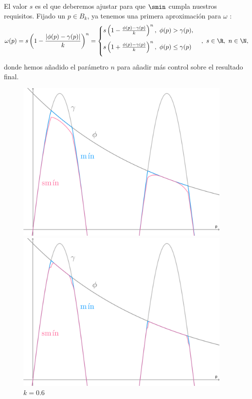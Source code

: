 El valor $s$ es el que deberemos ajustar para que $\smin$ cumpla nuestros requisitos. Fijado un $p\in B_{k}$, ya tenemos una primera aproximación para $\omega$ :
\begin{equation*}
    \omega(p) = s\left( 1-\frac{|\phi(p)-\gamma(p)|}{k} \right)^n = \begin{cases}
        s\left( 1-\frac{\phi(p)-\gamma(p)}{k}\right)^n,\ \phi(p)>\gamma(p), \\[10pt]
        s\left( 1+\frac{\phi(p)-\gamma(p)}{k}\right)^n,\ \phi(p)\le \gamma(p)\\[10pt]
    \end{cases}  ,\ s\in\R,\ n\in\N,
\end{equation*}
donde hemos añadido el parámetro $n$ para añadir más control sobre el resultado final.\newline 
\begin{figure}[!h]
     \begin{minipage}[c]{0.49\linewidth}
        \centering
        \includegraphics[width=0.95\textwidth]{Plantilla-TFG-master/img/smin_1.png}
        \caption{$k=0.6$}
     \end{minipage}
     \begin{minipage}[c]{0.49\linewidth}
        \centering
        \includegraphics[width=0.95\textwidth]{Plantilla-TFG-master/img/smin_2.png}

\end{minipage}
\end{figure}
